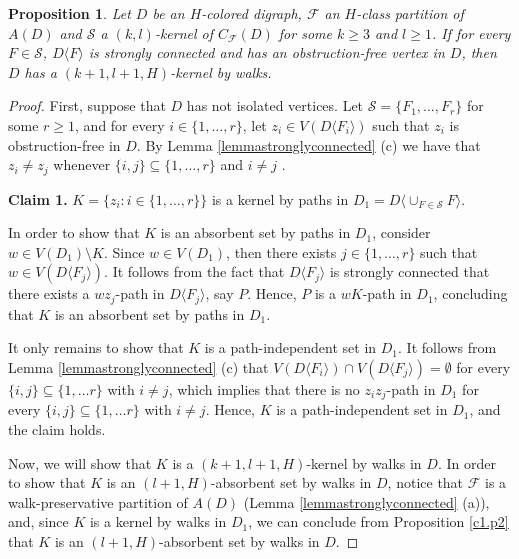 \documentclass[10pt,a4paper]{article}
\newtheorem{prop}[theorem]{Proposition}
\begin{document}
\begin{prop}
\label{propstrong2}
Let $D$ be an $H$-colored digraph, $\mathscr{F}$ an $H$-class partition of $A(D)$ and  $\mathcal{S}$ a $(k,l)$-kernel of $C_{\mathscr{F}}(D)$ for some $k \geq 3$ and $l \geq 1$. If for every $F \in \mathcal{S}$, $D \langle F \rangle$ is strongly connected and has an obstruction-free vertex in $D$, then $D$ has a $(k+1,l+1,H)$-kernel by walks.
\end{prop}
\begin{proof}
First, suppose that $D$ has not isolated vertices. Let $\mathcal{S}=\{ F_{1}, \ldots , F_{r} \}$ for some $r \geq 1$, and for every $i \in \{1, \ldots , r\}$, let $z_{i} \in V(D \langle F_{i} \rangle )$ such that $z_{i}$ is obstruction-free in $D$. By Lemma \ref{lemmastronglyconnected} (c) we have that $z_{i} \neq z_{j}$ whenever $\{ i, j \} \subseteq \{ 1, \ldots , r \}$ and $i \neq j$ .

\begin{description}
	\item \textbf{Claim 1.} $K=\{ z_{i} : i \in \{ 1, \ldots , r \}\}$ is a kernel by paths in $D_{1}=D \langle \cup _{F\in \mathcal{S}} F \rangle$.
	
	 In order to show that $K$ is an absorbent set by paths in $D_{1}$, consider $w \in V(D_{1}) \setminus K$. Since $w \in V(D_{1})$, then there exists $j \in \{ 1, \ldots , r \}$ such that $w \in V(D \langle F_{j} \rangle)$. It follows from the fact that $D\langle F_{j} \rangle$ is strongly connected that there exists a $wz_{j}$-path in $D \langle F_{j} \rangle$, say $P$. Hence, $P$ is a $wK$-path in $D_{1}$, concluding that $K$ is an absorbent set by paths in $D_{1}$.

It only remains to show that $K$ is a path-independent set in $D_{1}$. It follows from Lemma \ref{lemmastronglyconnected} (c) that $V(D\langle F_{i} \rangle ) \cap V(D \langle F_{j} \rangle ) = \emptyset$ for every $\{ i, j \} \subseteq \{ 1, \ldots r \}$ with $i \neq j$, which implies that there is no $z_{i}z_{j}$-path in $D_{1}$ for every $\{ i, j \} \subseteq \{ 1, \ldots r \}$ with $i \neq j$. Hence, $K$ is a path-independent set in $D_{1}$, and the claim holds.
\end{description}

Now, we will show that $K$ is a $(k+1, l+1, H)$-kernel by walks in $D$. In order to show that $K$ is an $(l+1,H)$-absorbent set by walks in $D$, notice that $\mathscr{F}$ is a walk-preservative partition of $A(D)$ (Lemma \ref{lemmastronglyconnected} (a)), and, since $K$ is a kernel by walks in $D_{1}$, we can conclude from Proposition \ref{c1.p2} that $K$ is an $(l+1,H)$-absorbent set by walks in $D$.


\end{proof}
\end{document}
